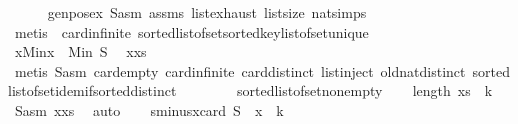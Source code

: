 \begin{isabellebody}
\ \ \ \ \isamarkupfalse%
\ genpos{\isacharunderscore}{\kern0pt}ex\ S{\isacharunderscore}{\kern0pt}asm\ assms\ list{\isachardot}{\kern0pt}exhaust\ list{\isachardot}{\kern0pt}size{\isacharparenleft}{\kern0pt}{}{\isacharparenright}{\kern0pt}\ nat{\isachardot}{\kern0pt}simps{\isacharparenleft}{\kern0pt}{}{\isacharparenright}{\kern0pt}\isanewline
\ \ \ \ \isamarkupfalse%
\ {\isacharparenleft}{\kern0pt}metis\ \ card{\isachardot}{\kern0pt}infinite\ sorted{\isacharunderscore}{\kern0pt}list{\isacharunderscore}{\kern0pt}of{\isacharunderscore}{\kern0pt}set{\isachardot}{\kern0pt}sorted{\isacharunderscore}{\kern0pt}key{\isacharunderscore}{\kern0pt}list{\isacharunderscore}{\kern0pt}of{\isacharunderscore}{\kern0pt}set{\isacharunderscore}{\kern0pt}unique{\isacharparenright}{\kern0pt}\isanewline
\ \ \isanewline
\ \ \isamarkupfalse%
\ x{\isacharunderscore}{\kern0pt}Min{\isacharcolon}{\kern0pt}{\isachardoublequoteopen}x\ {\isacharequal}{\kern0pt}\ Min\ S{\isachardoublequoteclose}\ \isamarkupfalse%
\ x{\isacharunderscore}{\kern0pt}xs\isanewline
\ \ \ \ \isamarkupfalse%
\ {\isacharparenleft}{\kern0pt}metis\ S{\isacharunderscore}{\kern0pt}asm\ card{\isachardot}{\kern0pt}empty\ card{\isachardot}{\kern0pt}infinite\ card{\isacharunderscore}{\kern0pt}distinct\ list{\isachardot}{\kern0pt}inject\ old{\isachardot}{\kern0pt}nat{\isachardot}{\kern0pt}distinct{\isacharparenleft}{\kern0pt}{}{\isacharparenright}{\kern0pt}\ sorted{\isacharunderscore}{\kern0pt}list{\isacharunderscore}{\kern0pt}of{\isacharunderscore}{\kern0pt}set{\isachardot}{\kern0pt}idem{\isacharunderscore}{\kern0pt}if{\isacharunderscore}{\kern0pt}sorted{\isacharunderscore}{\kern0pt}distinct\isanewline
\ \ \ \ \ \ \ \ sorted{\isacharunderscore}{\kern0pt}list{\isacharunderscore}{\kern0pt}of{\isacharunderscore}{\kern0pt}set{\isacharunderscore}{\kern0pt}nonempty{\isacharparenright}{\kern0pt}\isanewline
\isanewline
\ \ \isamarkupfalse%
\ {\isachardoublequoteopen}length\ xs\ {\isacharequal}{\kern0pt}\ k{\isachardoublequoteclose}\ \isamarkupfalse%
\ S{\isacharunderscore}{\kern0pt}asm\ x{\isacharunderscore}{\kern0pt}xs\ \isamarkupfalse%
\ auto\isanewline
\ \ \isamarkupfalse%
\ sminus{\isacharunderscore}{\kern0pt}x{\isacharcolon}{\kern0pt}{\isachardoublequoteopen}card\ {\isacharparenleft}{\kern0pt}S\ {\isacharminus}{\kern0pt}\ {\isacharbraceleft}{\kern0pt}x{\isacharbraceright}{\kern0pt}{\isacharparenright}{\kern0pt}\ {\isacharequal}{\kern0pt}\ k{\isachardoublequoteclose}\ \isamarkupfalse%

\end{isabellebody}
